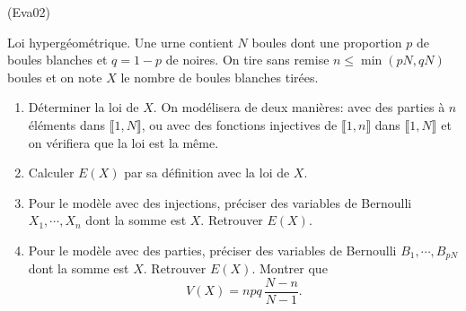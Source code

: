 \begin{tiny}(Eva02)\end{tiny} Loi hypergéométrique.\newline
Une urne contient $N$ boules dont une proportion $p$ de boules blanches et $q = 1-p$ de noires.\newline 
On tire sans remise $n \leq \min(pN,qN)$ boules et on note $X$ le nombre de boules blanches tirées.
\begin{enumerate}
  \item Déterminer la loi de $X$. On modélisera de deux manières: avec des parties à $n$ éléments dans $\llbracket 1, N\rrbracket$, ou avec des fonctions injectives de $\llbracket 1,n\rrbracket$ dans $\llbracket 1,N \rrbracket$ et on vérifiera que la loi est la même.
  \item Calculer $E(X)$ par sa définition avec la loi de $X$.
  \item Pour le modèle avec des injections, préciser des variables de Bernoulli $X_1, \cdots, X_n$ dont la somme est $X$. Retrouver $E(X)$.
  \item Pour le modèle avec des parties, préciser des variables de Bernoulli $B_1, \cdots, B_{pN}$ dont la somme est $X$. Retrouver $E(X)$. Montrer que
\[
  V(X) = npq\, \frac{N - n}{N - 1}.
\]

\end{enumerate}

